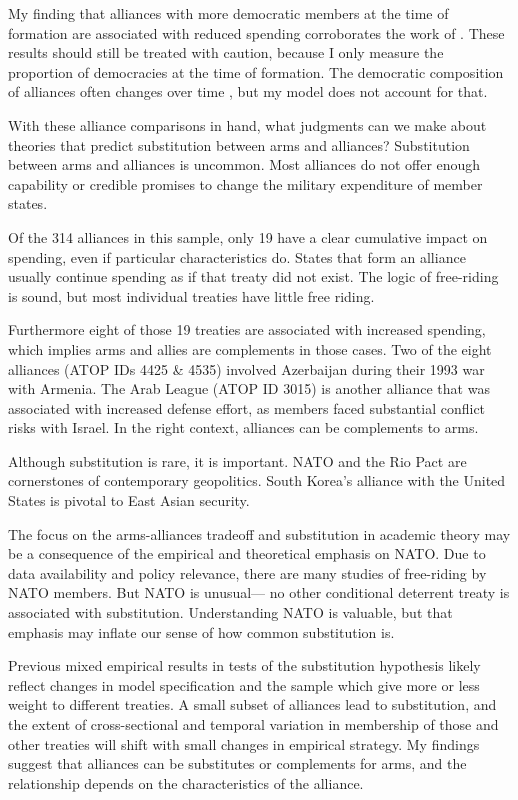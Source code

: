 \documentclass[12pt]{article}
\begin{document}
My finding that alliances with more democratic members at the time of formation are associated with reduced spending corroborates the work of \citet{DigiuseppePoast2016}. These results should still be treated with caution, because I only measure the proportion of democracies at the time of formation. The democratic composition of alliances often changes over time \citep{GiblerWolford2006}, but my model does not account for that. 

With these alliance comparisons in hand, what judgments can we make about theories that predict substitution between arms and alliances? Substitution between arms and alliances is uncommon. Most alliances do not offer enough capability or credible promises to change the military expenditure of member states. 

Of the 314 alliances in this sample, only 19 have a clear cumulative impact on spending, even if particular characteristics do. States that form an alliance usually continue spending as if that treaty did not exist. The logic of free-riding is sound, but most individual treaties have little free riding.

Furthermore eight of those 19 treaties are associated with increased spending, which implies arms and allies are complements in those cases. Two of the eight alliances (ATOP IDs 4425 \& 4535) involved Azerbaijan during their 1993 war with Armenia. The Arab League (ATOP ID 3015) is another alliance that was associated with increased defense effort, as members faced substantial conflict risks with Israel. In the right context, alliances can be complements to arms. 

Although substitution is rare, it is important. NATO and the Rio Pact are cornerstones of contemporary geopolitics. South Korea's alliance with the United States is pivotal to East Asian security. 

The focus on the arms-alliances tradeoff and substitution in academic theory may be a consequence of the empirical and theoretical emphasis on NATO. Due to data availability and policy relevance, there are many studies of free-riding by NATO members. But NATO is unusual--- no other conditional deterrent treaty is associated with substitution. Understanding NATO is valuable, but that emphasis may inflate our sense of how common substitution is. 

Previous mixed empirical results in tests of the substitution hypothesis likely reflect changes in model specification and the sample which give more or less weight to different treaties. A small subset of alliances lead to substitution, and the extent of cross-sectional and temporal variation in membership of those and other treaties will shift with small changes in empirical strategy. My findings suggest that alliances can be substitutes or complements for arms, and the relationship depends on the characteristics of the alliance. 
\end{document}
